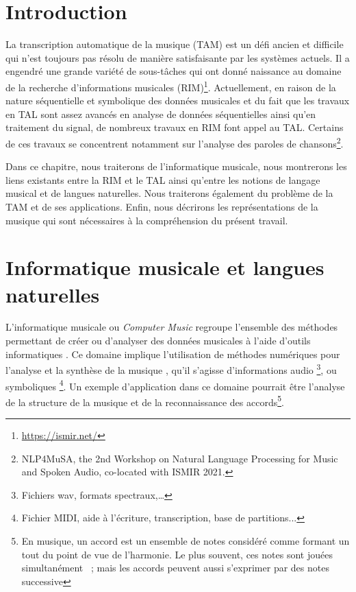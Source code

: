\section*{Introduction}
La transcription automatique de la musique (TAM) est un défi ancien
\cite{first_one} et difficile qui n’est toujours pas résolu de manière
satisfaisante par les systèmes actuels. Il a engendré une
grande variété de sous-tâches qui ont donné naissance au domaine de la
recherche d’informations musicales (RIM)\footnote{\url{https://ismir.net/}}.
Actuellement, en raison de la nature séquentielle et symbolique des données
musicales et du fait que les travaux en TAL sont assez avancés en analyse de
données séquentielles ainsi qu’en traitement du signal, de nombreux travaux en
RIM font appel au TAL. Certains de ces travaux se concentrent notamment sur
l’analyse des paroles de chansons\footnote{NLP4MuSA, the 2nd Workshop on
Natural Language Processing for Music and Spoken Audio, co-located with ISMIR
2021.}.

Dans ce chapitre, nous traiterons de l’informatique musicale, nous montrerons
les liens existants entre la RIM et le TAL ainsi qu’entre les notions de
langage musical et de langues naturelles. Nous traiterons également du problème
de la TAM et de ses applications. Enfin, nous décrirons les représentations de
la musique qui sont nécessaires à la compréhension du présent travail.

\section{Informatique musicale et langues naturelles}
L’informatique musicale ou \textit{Computer Music} regroupe l’ensemble des
méthodes permettant de créer ou d’analyser des données musicales à l’aide
d’outils informatiques \cite{book_muller}. Ce domaine implique l’utilisation de
méthodes numériques pour l’analyse et la synthèse de la musique \cite{fourier},
qu’il s’agisse d’informations audio \footnote{Fichiers wav, formats
spectraux,…}, ou symboliques \footnote{Fichier MIDI, aide à l’écriture,
transcription, base de partitions...}. Un exemple d’application dans ce domaine
pourrait être l’analyse de la structure de la musique et de la reconnaissance
des accords\footnote{En musique, un accord est un ensemble de notes considéré
comme formant un tout du point de vue de l’harmonie. Le plus souvent, ces notes
sont jouées simultanément~ ; mais les accords peuvent aussi s’exprimer par des
notes successive}.

